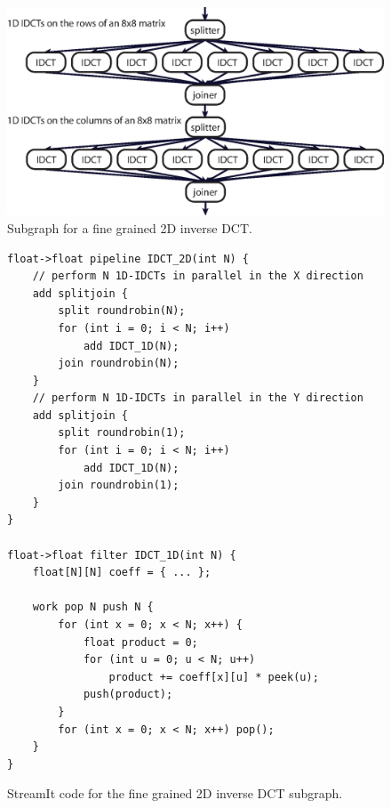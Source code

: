\begin{figure}[h]
  \begin{center}
    \includegraphics[scale=0.6, angle=0]{./dct_block.eps}
    \caption{Subgraph for a fine grained 2D inverse DCT.}
    \label{fig:decoder-sj-graph}
  \end{center}
\end{figure}

\begin{figure}[h]
  \begin{center}
    \begin{minipage}{4in}
      \begin{small}
        \begin{verbatim}
float->float pipeline IDCT_2D(int N) {
    // perform N 1D-IDCTs in parallel in the X direction
    add splitjoin {
        split roundrobin(N);
        for (int i = 0; i < N; i++)
            add IDCT_1D(N);
        join roundrobin(N);
    }
    // perform N 1D-IDCTs in parallel in the Y direction
    add splitjoin {
        split roundrobin(1);
        for (int i = 0; i < N; i++)
            add IDCT_1D(N);
        join roundrobin(1);
    }
}

float->float filter IDCT_1D(int N) {
    float[N][N] coeff = { ... };
       
    work pop N push N {
        for (int x = 0; x < N; x++) {
            float product = 0;
            for (int u = 0; u < N; u++)
                product += coeff[x][u] * peek(u);
            push(product);
        }
        for (int x = 0; x < N; x++) pop();
    }
}
        \end{verbatim}
      \end{small}
    \end{minipage}
  \end{center}
  \caption{StreamIt code for the fine grained 2D inverse DCT subgraph.}
  \label{fig:decoder-sj}
\end{figure}

